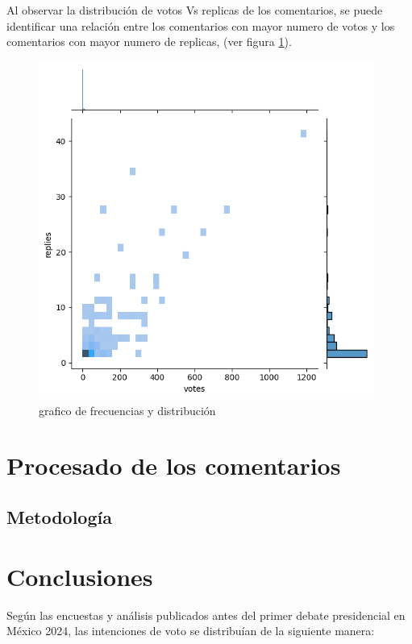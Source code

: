 Al observar la distribución de votos Vs replicas de los comentarios, se puede identificar una relación entre los comentarios con mayor numero de votos y los comentarios con mayor numero de replicas, (ver figura \ref{fig:FyD}).\\


\begin{figure}[h!]
	\centering
	\includegraphics[width=11cm]{../Datos/AcumulacionYdistribuciones}
	\caption{grafico de frecuencias y distribución}
	\label{fig:FyD}
\end{figure}

\chapter{Procesado de los comentarios}

\section{Metodología}





\chapter{Conclusiones}

Según las encuestas y análisis publicados antes del primer debate presidencial en México 2024, las intenciones de voto se distribuían de la siguiente manera:

